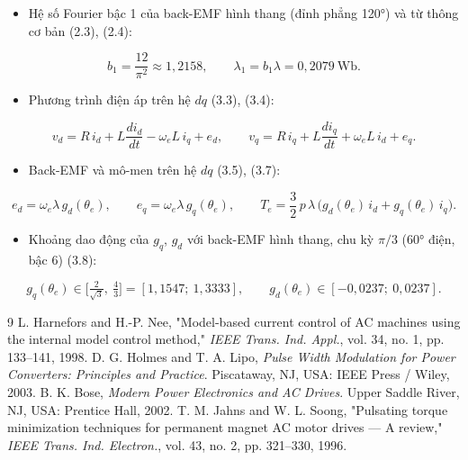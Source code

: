 \documentclass[11pt,a4paper]{article}
\begin{document}
\begin{itemize}[leftmargin=*]
\item Hệ số Fourier bậc 1 của back-EMF hình thang (đỉnh phẳng 120°) và từ thông cơ bản (2.3), (2.4):
\end{itemize}

\[
b_1 = \frac{12}{\pi^2} \approx 1{,}2158, \qquad \lambda_1 = b_1\lambda = 0{,}2079\ \text{Wb}.
\]

\begin{itemize}[leftmargin=*]
\item Phương trình điện áp trên hệ $dq$ (3.3), (3.4):
\end{itemize}

\[
v_d = R\,i_d + L\frac{di_d}{dt} - \omega_e L\, i_q + e_d, \qquad
v_q = R\,i_q + L\frac{di_q}{dt} + \omega_e L\, i_d + e_q .
\]

\begin{itemize}[leftmargin=*]
\item Back-EMF và mô-men trên hệ $dq$ (3.5), (3.7):
\end{itemize}

\[
e_d = \omega_e\lambda\, g_d(\theta_e), \qquad e_q = \omega_e\lambda\, g_q(\theta_e), \qquad
T_e = \frac32\,p\,\lambda\,\big(g_d(\theta_e)\, i_d + g_q(\theta_e)\, i_q\big).
\]

\begin{itemize}[leftmargin=*]
\item Khoảng dao động của $g_q$, $g_d$ với back-EMF hình thang, chu kỳ $\pi/3$ (60° điện, bậc 6) (3.8):
\end{itemize}

\[
g_q(\theta_e) \in \Big[\tfrac{2}{\sqrt3},\ \tfrac43\Big] = [1{,}1547;\ 1{,}3333], \qquad g_d(\theta_e)\in[-0{,}0237;\ 0{,}0237].
\]

\setcounter{section}{3}



\begin{thebibliography}{9}
\small
{} L. Harnefors and H.-P. Nee, "Model-based current control of AC machines using the internal model control method," \emph{IEEE Trans. Ind. Appl.}, vol. 34, no. 1, pp. 133–141, 1998.
 D. G. Holmes and T. A. Lipo, \emph{Pulse Width Modulation for Power Converters: Principles and Practice}. Piscataway, NJ, USA: IEEE Press / Wiley, 2003.
 B. K. Bose, \emph{Modern Power Electronics and AC Drives}. Upper Saddle River, NJ, USA: Prentice Hall, 2002.
 T. M. Jahns and W. L. Soong, "Pulsating torque minimization techniques for permanent magnet AC motor drives — A review," \emph{IEEE Trans. Ind. Electron.}, vol. 43, no. 2, pp. 321–330, 1996.
\end{thebibliography}
\end{document}
